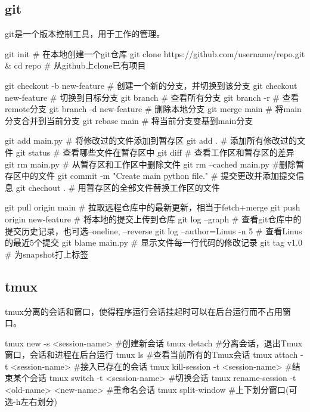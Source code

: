 \subsection{git}
git是一个版本控制工具，用于工作的管理。
\begin{codeblock}[language=bash, caption={git command}]
  git init # 在本地创建一个git仓库
  git clone https://github.com/username/repo.git & cd repo # 从github上clone已有项目
  
  git checkout -b new-feature # 创建一个新的分支，并切换到该分支
  git checkout new-feature # 切换到目标分支
  git branch # 查看所有分支
  git branch -r # 查看remote分支
  git branch -d new-feature # 删除本地分支
  git merge main # 将main分支合并到当前分支
  git rebase main # 将当前分支变基到main分支
  
  git add main.py # 将修改过的文件添加到暂存区
  git add . # 添加所有修改过的文件
  git status # 查看哪些文件在暂存区中
  git diff # 查看工作区和暂存区的差异
  git rm main.py # 从暂存区和工作区中删除文件
  git rm --cached main.py #删除暂存区中的文件
  git commit -m "Create main python file." # 提交更改并添加提交信息
  git chechout . # 用暂存区的全部文件替换工作区的文件
  
  git pull origin main # 拉取远程仓库中的最新更新，相当于fetch+merge
  git push origin new-feature # 将本地的提交上传到仓库
  git log --graph # 查看git仓库中的提交历史记录，也可选--oneline, --reverse
  git log --author=Linus -n 5 # 查看Linus的最近5个提交
  git blame main.py # 显示文件每一行代码的修改记录
  git tag v1.0 # 为snapshot打上标签
\end{codeblock}

\subsection{tmux}
tmux分离的会话和窗口，使得程序运行会话挂起时可以在后台运行而不占用窗口。
\begin{codeblock}[language=bash, caption={tmux command}]
  tmux new -s <session-name> #创建新会话
  tmux detach #分离会话，退出Tmux窗口，会话和进程在后台运行
  tmux ls #查看当前所有的Tmux会话
  tmux attach -t <session-name> #接入已存在的会话
  tmux kill-session -t <session-name> #结束某个会话
  tmux switch -t <session-name> #切换会话
  tmux rename-session -t <old-name> <new-name> #重命名会话
  tmux split-window #上下划分窗口(可选-h左右划分)
\end{codeblock}
